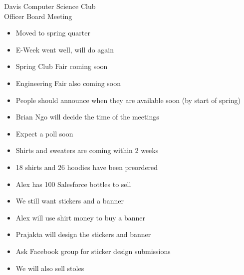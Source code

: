 \documentclass{article}
\begin{document}
\begin{Minutes}{Davis Computer Science Club\\Officer Board Meeting}
\missingExcused{}




\maketitle
{}
\begin{itemize}
\item Moved to spring quarter
\end{itemize}

\begin{itemize}
\item E-Week went well, will do again
\item Spring Club Fair coming soon
\item Engineering Fair also coming soon
\end{itemize}

\begin{itemize}
\item People should announce when they are available soon (by start of spring)
\item Brian Ngo will decide the time of the meetings
\item Expect a poll soon
\end{itemize}

\begin{itemize}
\item Shirts and sweaters are coming within 2 weeks
\item 18 shirts and 26 hoodies have been preordered
\item Alex has 100 Salesforce bottles to sell
\item We still want stickers and a banner
\item Alex will use shirt money to buy a banner
\item Prajakta will design the stickers and banner
\item Ask Facebook group for sticker design submissions
\item We will also sell stoles
\end{itemize}


\end{Minutes}
\end{document}
